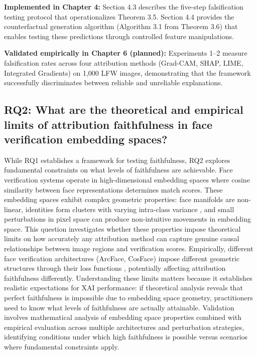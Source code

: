 \vspace{0.3cm}
\noindent\textbf{Implemented in Chapter 4:} Section 4.3 describes the five-step falsification testing protocol that operationalizes Theorem 3.5. Section 4.4 provides the counterfactual generation algorithm (Algorithm 3.1 from Theorem 3.6) that enables testing these predictions through controlled feature manipulations.

\vspace{0.3cm}
\noindent\textbf{Validated empirically in Chapter 6 (planned):} Experiments 1--2 measure falsification rates across four attribution methods (Grad-CAM, SHAP, LIME, Integrated Gradients) on 1,000 LFW images, demonstrating that the framework successfully discriminates between reliable and unreliable explanations.

\subsection*{RQ2: What are the theoretical and empirical limits of attribution faithfulness in face verification embedding spaces?}

While RQ1 establishes a framework for testing faithfulness, RQ2 explores fundamental constraints on what levels of faithfulness are achievable. Face verification systems operate in high-dimensional embedding spaces \cite{wang2021survey,masi2018survey} where cosine similarity between face representations determines match scores. These embedding spaces exhibit complex geometric properties: face manifolds are non-linear, identities form clusters with varying intra-class variance \cite{schroff2015facenet,parkhi2015vggface}, and small perturbations in pixel space can produce non-intuitive movements in embedding space. This question investigates whether these properties impose theoretical limits on how accurately any attribution method can capture genuine causal relationships between image regions and verification scores. Empirically, different face verification architectures (ArcFace, CosFace) impose different geometric structures through their loss functions \cite{deng2019arcface,wang2018cosface,liu2017sphereface}, potentially affecting attribution faithfulness differently. Understanding these limits matters because it establishes realistic expectations for XAI performance: if theoretical analysis reveals that perfect faithfulness is impossible due to embedding space geometry, practitioners need to know what levels of faithfulness are actually attainable. Validation involves mathematical analysis of embedding space properties combined with empirical evaluation across multiple architectures and perturbation strategies, identifying conditions under which high faithfulness is possible versus scenarios where fundamental constraints apply.

